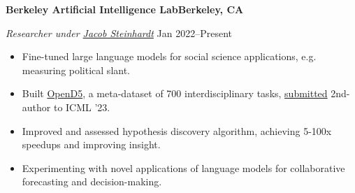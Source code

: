 \textbf{Berkeley Artificial Intelligence Lab\hfill Berkeley, CA}\par
\textit{Researcher under \href{https://jsteinhardt.stat.berkeley.edu/}{Jacob Steinhardt} } \hfill Jan 2022--Present\par
\begin{itemize}
	\item Fine-tuned large language models for social science applications, e.g. measuring political slant.
	\item Built \href{https://github.com/petezh/OpenD5}{OpenD5}, a meta-dataset of 700 interdisciplinary tasks, \href{https://arxiv.org/abs/2302.14233}{submitted} 2nd-author to ICML '23.
	\item Improved and assessed hypothesis discovery algorithm, achieving 5-100x speedups and improving insight.
	\item Experimenting with novel applications of language models for collaborative forecasting and decision-making.
\end{itemize} \par